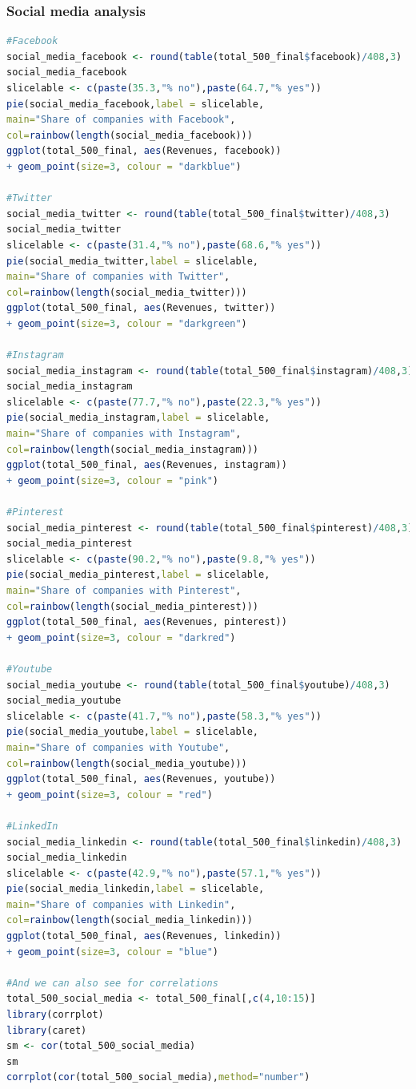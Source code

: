\documentclass{book}
\begin{document}
\subsubsection{Social media analysis}\label{r: van: sm}
\begin{lstlisting}[language=R] 
#Facebook
social_media_facebook <- round(table(total_500_final$facebook)/408,3)
social_media_facebook
slicelable <- c(paste(35.3,"% no"),paste(64.7,"% yes"))
pie(social_media_facebook,label = slicelable,
main="Share of companies with Facebook",
col=rainbow(length(social_media_facebook)))
ggplot(total_500_final, aes(Revenues, facebook)) 
+ geom_point(size=3, colour = "darkblue")

#Twitter
social_media_twitter <- round(table(total_500_final$twitter)/408,3)
social_media_twitter
slicelable <- c(paste(31.4,"% no"),paste(68.6,"% yes"))
pie(social_media_twitter,label = slicelable,
main="Share of companies with Twitter",
col=rainbow(length(social_media_twitter)))
ggplot(total_500_final, aes(Revenues, twitter)) 
+ geom_point(size=3, colour = "darkgreen")

#Instagram
social_media_instagram <- round(table(total_500_final$instagram)/408,3)
social_media_instagram
slicelable <- c(paste(77.7,"% no"),paste(22.3,"% yes"))
pie(social_media_instagram,label = slicelable,
main="Share of companies with Instagram",
col=rainbow(length(social_media_instagram)))
ggplot(total_500_final, aes(Revenues, instagram)) 
+ geom_point(size=3, colour = "pink")

#Pinterest
social_media_pinterest <- round(table(total_500_final$pinterest)/408,3)
social_media_pinterest
slicelable <- c(paste(90.2,"% no"),paste(9.8,"% yes"))
pie(social_media_pinterest,label = slicelable,
main="Share of companies with Pinterest",
col=rainbow(length(social_media_pinterest)))
ggplot(total_500_final, aes(Revenues, pinterest)) 
+ geom_point(size=3, colour = "darkred")

#Youtube
social_media_youtube <- round(table(total_500_final$youtube)/408,3)
social_media_youtube
slicelable <- c(paste(41.7,"% no"),paste(58.3,"% yes"))
pie(social_media_youtube,label = slicelable,
main="Share of companies with Youtube",
col=rainbow(length(social_media_youtube)))
ggplot(total_500_final, aes(Revenues, youtube)) 
+ geom_point(size=3, colour = "red")

#LinkedIn
social_media_linkedin <- round(table(total_500_final$linkedin)/408,3)
social_media_linkedin
slicelable <- c(paste(42.9,"% no"),paste(57.1,"% yes"))
pie(social_media_linkedin,label = slicelable,
main="Share of companies with Linkedin",
col=rainbow(length(social_media_linkedin)))
ggplot(total_500_final, aes(Revenues, linkedin)) 
+ geom_point(size=3, colour = "blue")

#And we can also see for correlations
total_500_social_media <- total_500_final[,c(4,10:15)]
library(corrplot)
library(caret)
sm <- cor(total_500_social_media)
sm
corrplot(cor(total_500_social_media),method="number")
\end{lstlisting}
\end{document}
